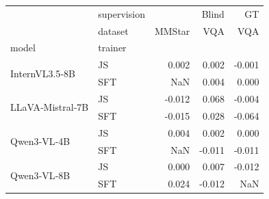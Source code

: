 \begin{tabular}{llrrr}
\toprule
 & supervision & \multicolumn{2}{r}{Blind} & GT \\
 & dataset & MMStar & VQA & VQA \\
model & trainer &  &  &  \\
\midrule
\multirow[t]{2}{*}{InternVL3.5‑8B} & JS & 0.002 & 0.002 & -0.001 \\
 & SFT & NaN & 0.004 & 0.000 \\
\cline{1-5}
\multirow[t]{2}{*}{LLaVA‑Mistral‑7B} & JS & -0.012 & 0.068 & -0.004 \\
 & SFT & -0.015 & 0.028 & -0.064 \\
\cline{1-5}
\multirow[t]{2}{*}{Qwen3‑VL‑4B} & JS & 0.004 & 0.002 & 0.000 \\
 & SFT & NaN & -0.011 & -0.011 \\
\cline{1-5}
\multirow[t]{2}{*}{Qwen3‑VL‑8B} & JS & 0.000 & 0.007 & -0.012 \\
 & SFT & 0.024 & -0.012 & NaN \\
\cline{1-5}
\bottomrule
\end{tabular}
